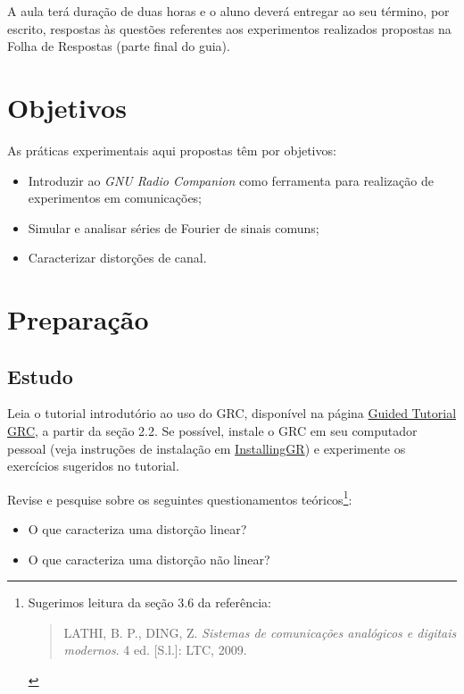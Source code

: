 \documentclass[12pt,addpoints]{exam}
\begin{document}
A aula terá duração de duas horas e o aluno deverá entregar ao seu término, por escrito, respostas às questões referentes aos experimentos realizados propostas na Folha de Respostas (parte final do guia).

\section{Objetivos}

As práticas experimentais aqui propostas têm por objetivos:
\begin{itemize}
    \item Introduzir ao \textit{GNU Radio Companion} como ferramenta para realização de experimentos em comunicações;
    \item Simular e analisar séries de Fourier de sinais comuns;
    \item Caracterizar distorções de canal.
\end{itemize}

\newpage

\section{Preparação} \label{sect:Preparacao}

\subsection{Estudo}

Leia o tutorial introdutório ao uso do GRC, disponível na página \href{http://wiki.gnuradio.org/index.php/Guided_Tutorial_GRC}{Guided Tutorial GRC}, a partir da seção 2.2. Se possível, instale o GRC em seu computador pessoal (veja instruções de instalação em \href{http://wiki.gnuradio.org/index.php/InstallingGR}{InstallingGR}) e experimente os exercícios sugeridos no tutorial.

Revise e pesquise sobre os seguintes questionamentos teóricos\footnote{Sugerimos leitura da seção 3.6 da referência: \begin{quote} LATHI, B. P., DING, Z. \textit{Sistemas de comunicações analógicos e digitais modernos}. 4 ed. [S.l.]: LTC, 2009. \end{quote}}:
\begin{itemize}
    \item O que caracteriza uma distorção linear?
    \item O que caracteriza uma distorção não linear?
\end{itemize}
\end{document}
